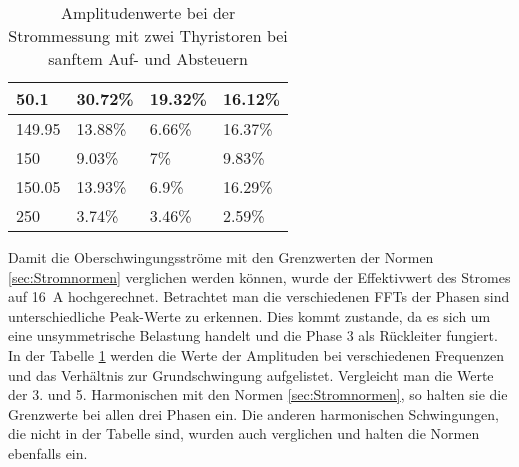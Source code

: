 \begin{table}[ht]
\begin{tabular}{|l|l|l|l|}
		50.1              & 30.72\%                                                                             & 19.32\%                                                                             & 16.12\%                                                                             \\ \hline
		149.95            & 13.88\%                                                                             & 6.66\%                                                                              & 16.37\%                                                                             \\ \hline
		150               & 9.03\%                                                                              & 7\%                                                                                 & 9.83\%                                                                              \\ \hline
		150.05            & 13.93\%                                                                             & 6.9\%                                                                               & 16.29\%                                                                             \\ \hline
		250		          & 3.74\%                                                                             & 3.46\%                                                                               & 2.59\%                                                                             \\ \hline
	\end{tabular}
	\caption{Amplitudenwerte bei der Strommessung mit zwei Thyristoren bei sanftem Auf- und Absteuern}\label{tab:Mess_2Thyristoren_Spannung_Widerstand_AufAb_sanft_stroeme}
\end{table}

Damit die Oberschwingungsströme mit den  Grenzwerten der Normen \ref{sec:Stromnormen} verglichen werden können, wurde der Effektivwert des Stromes auf \SI{16}{A} hochgerechnet. Betrachtet man die verschiedenen FFTs der Phasen sind unterschiedliche Peak-Werte zu erkennen. Dies kommt zustande, da es sich um eine unsymmetrische Belastung handelt und die Phase 3 als Rückleiter fungiert. In der Tabelle \ref{tab:Mess_2Thyristoren_Spannung_Widerstand_AufAb_sanft_stroeme} werden die Werte der Amplituden bei verschiedenen Frequenzen und das Verhältnis zur Grundschwingung aufgelistet. Vergleicht man die Werte der 3. und 5. Harmonischen mit den Normen \ref{sec:Stromnormen}, so halten sie die Grenzwerte bei allen drei Phasen ein. Die anderen harmonischen Schwingungen, die nicht in der Tabelle sind, wurden auch verglichen und halten die Normen ebenfalls ein.

